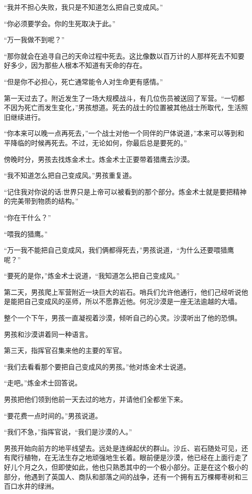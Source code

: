 \documentclass[twoside,openany]{book}
\begin{document}
“我并不担心失败，我只是不知道怎么把自己变成风。”

“你必须要学会。你的生死取决于此。”

“万一我做不到呢？”

“那你就会在追寻自己的天命过程中死去。这比像数以百万计的人那样死去不知要好多少，因为那些人根本不知道有天命的存在。

“但是你不必担心，死亡通常能令人对生命更有感情。”

第一天过去了。附近发生了一场大规模战斗，有几位伤员被送回了军营。“一切都不因为死亡而发生变化，”男孩想道。死去的战士的位置被其他战士所取代，生活照旧继续进行。

“你本来可以晚一点再死去，”一个战士对他一个同伴的尸体说道，”本来可以等到和平降临的时候再死去。不过，无论如何，你最后总是要死的。”

傍晚时分，男孩去找炼金术士。炼金术士正要带着猎鹰去沙漠。

“我不知道怎么把自己变成风。”男孩重复道。

“记住我对你说的话:世界只是上帝可以被看到的那个部分。炼金术士就是要把精神的完美带到物质的结构。”

“你在干什么？”

“喂我的猎鹰。”

“万一我不能把自己变成风，我们俩都得死去，”男孩说道，“为什么还要喂猎鹰呢？”

“要死的是你，”炼金术士说道，“我知道怎么把自己变成风。”

第二天，男孩爬上军营附近一块巨大的岩石。哨兵们允许他通行，他们己经听说他是能把自己变成风的巫师，所以不愿靠近他。何况沙漠是一座无法逾越的大墙。

整个一个下午，男孩一直凝视着沙漠，倾听自己的心灵。沙漠听出了他的恐惧。

男孩和沙漠讲着同一种语言。

第三天，指挥官召集来他的主要的军官。

“我们去看看那个要把自己变成风的男孩。”他对炼金术士说道。

“走吧。”炼金术士回答说。

男孩把他们领到他前一天去过的地方，并请他们全都坐下来。

“要花费一点时间的。”男孩说道。

“我们不急，”指挥官说，“我们是沙漠的人。”

男孩开始向前方的地平线望去。远处是连绵起伏的群山。沙丘、岩石随处可见，还有爬行植物，在无法生存之地顽强地生长着。眼前便是沙漠，他已经在上面行走了好儿个月之久，但即使如此，他也只熟悉其中的一个极小部分。正是在这个极小的部分，他遇到了英国人、商队和部落之间的战争，还有一个拥有五万棵椰枣树和三百口水井的绿洲。
\end{document}

